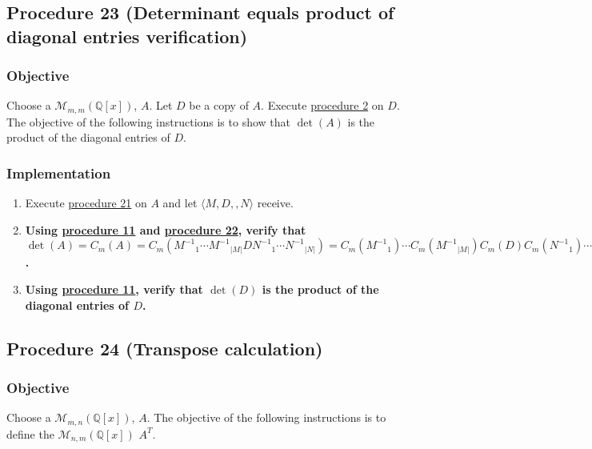 \documentclass[twocolumn]{article}
\begin{document}
		\subsection{Procedure 23 (Determinant equals product of diagonal entries verification)}\label{sec:procedure 23}
			\subsubsection{Objective}
				Choose a $\mathcal{M}_{m,m}(\mathbb{Q}[x])$, $A$. Let $D$ be a copy of $A$. Execute \hyperref[sec:procedure 2]{procedure 2} on $D$. The objective of the following instructions is to show that $\det(A)$ is the product of the diagonal entries of $D$.
			\subsubsection{Implementation}
				\begin{enumerate}
					\item Execute \hyperref[sec:procedure 21]{procedure 21} on $A$ and let $\langle M,D,,N\rangle$ receive.
					\item \textbf{Using \hyperref[sec:procedure 11]{procedure 11} and \hyperref[sec:procedure 22]{procedure 22}, verify that $\det(A)=C_m(A)=C_m({M^{-1}}_1\cdots {M^{-1}}_{\lvert M\rvert}D{N^{-1}}_1\cdots {N^{-1}}_{\lvert N\rvert})=C_m({M^{-1}}_1)\cdots C_m({M^{-1}}_{\lvert M\rvert})C_m(D)C_m({N^{-1}}_1)\cdots\allowbreak C_m({N^{-1}}_{\lvert N\rvert})=1\cdots 1C_m(D)1\cdots 1=C_m(D)=\det(D)$.}
					\item \textbf{Using \hyperref[sec:procedure 11]{procedure 11}, verify that $\det(D)$ is the product of the diagonal entries of $D$.}
				\end{enumerate}
		\subsection{Procedure 24 (Transpose calculation)}\label{sec:procedure 24}
			\subsubsection{Objective}
				Choose a $\mathcal{M}_{m,n}(\mathbb{Q}[x])$, $A$. The objective of the following instructions is to define the $\mathcal{M}_{n,m}(\mathbb{Q}[x])$ $A^T$.
\end{document}
